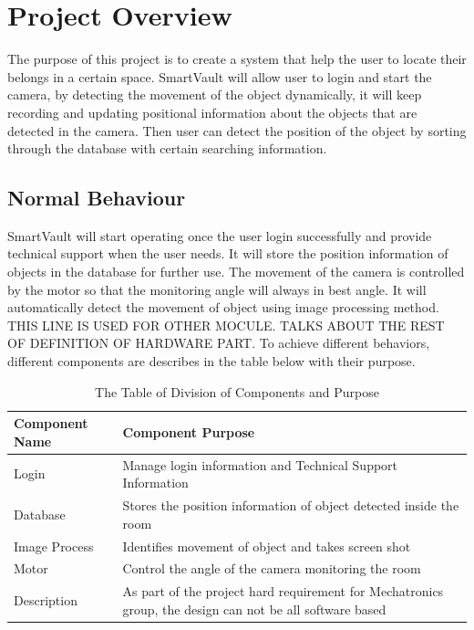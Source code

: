 \documentclass[12pt, titlepage]{article}
\begin{document}
\section{Project Overview}
The purpose of this project is to create a system that help the user to locate their belongs in a certain space. SmartVault will allow user to login and start the camera, by detecting the movement of the object dynamically, it will keep recording and updating positional information about the objects that are detected in the camera. Then user can detect the position of the object by sorting through the database with certain searching information.
\subsection{Normal Behaviour}
SmartVault will start operating once the user login successfully and provide technical support when the user needs. It will store the position information of objects in the database for further use. The movement of the camera is controlled by the motor so that the monitoring angle will always in best angle. It will automatically detect the movement of object using image processing method. THIS LINE IS USED FOR OTHER MOCULE. TALKS ABOUT THE REST OF DEFINITION OF HARDWARE PART. To achieve different behaviors, different components are describes in the table below with their purpose. 

\begin{table}[H]
\begin{center}
\caption {The Table of Division of Components and Purpose}
    \begin{tabular}{| p{5cm}| p{9.5cm} |}
    \hline
    \textbf{Component Name} & \textbf{Component Purpose}  \\
    \hline
    Login & Manage login information and Technical Support Information \\
    \hline
    Database  & Stores the position information of object detected inside the room\\
    \hline
    Image Process & Identifies movement of object and takes screen shot\\
    \hline
    Motor & Control the angle of the camera monitoring the room\\
    \hline
    Description & As part of the project hard requirement for Mechatronics group, the design can not be all software based \\
    \hline
    \end{tabular}
\end{center}
\end{table}
\end{document}
